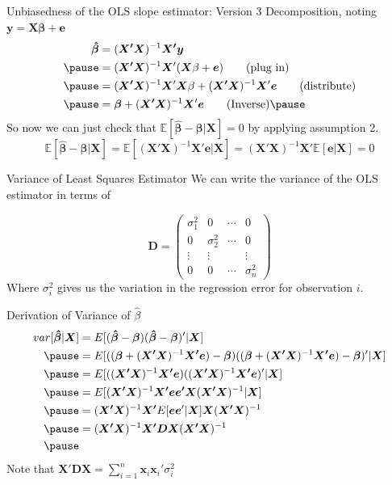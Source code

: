 \documentclass[aspectratio=169, handout]{beamer}
\numberwithin{equation}{section}
\begin{document}
\begin{frame}{Unbiasedness of the OLS slope estimator: Version 3}
Decomposition, noting $\bm{y}=\bm{X}\bm{\beta}+\bm{e}$ 
\begin{align*}
\bm{\hat{\beta}}&=(\bm{X'X})^{-1}\bm{X'y}\\ \pause
&=(\bm{X'X})^{-1}\bm{X}'(\bm{X}\beta+\bm{e}) \tag{plug in}\\ \pause
&=(\bm{X'X})^{-1}\bm{X}'\bm{X}\beta+(\bm{X'X})^{-1}\bm{X}'\bm{e}  \tag{distribute}\\ \pause
&=\bm{\beta}+(\bm{X'X})^{-1}\bm{X}'\bm{e}\tag{Inverse} \pause
\end{align*}
So now we can just check that $\mathbb{E}[\bm{\hat{\beta}}-\bm{\beta}|\bm{X}]=0$ by applying assumption 2.
$$\mathbb{E}[\bm{\hat{\beta}}-\bm{\beta}|\bm{X}]=\mathbb{E}[(\bm{X'X})^{-1}\bm{X}'\bm{e}|\bm{X}]=(\bm{X'X})^{-1}\bm{X}'\mathbb{E}[\bm{e}|\bm{X}]=0$$
\end{frame}


\begin{frame}{Variance of Least Squares Estimator}
We can write the variance of the OLS estimator in terms of 

$$\bm{D}=\begin{pmatrix} \sigma_1^2 &0 &\cdots& 0 \\ 0& \sigma_2^2& \cdots& 0 \\ \vdots & \vdots & & \vdots\\ 0&0&\cdots &\sigma_n^2\end{pmatrix}$$
Where $\sigma_i^2$ gives us the variation in the regression error for observation $i$.
\end{frame}

\begin{frame}{Derivation of Variance of $\hat{\beta}$}
\begin{align*}
var[\bm{\hat{\beta}}|\bm{X}]&=E[(\bm{\hat{\beta}}-\bm{\beta})(\bm{\hat{\beta}}-\bm{\beta})'|\bm{X}]\\ \pause
&=E[((\bm{\beta}+(\bm{X'X})^{-1}\bm{X'e})-\bm{\beta})((\bm{\beta}+(\bm{X'X})^{-1}\bm{X'e})-\bm{\beta})'|\bm{X}]\\ \pause
&=E[((\bm{X'X})^{-1}\bm{X'e})((\bm{X'X})^{-1}\bm{X'e})'|\bm{X}]\\ \pause
&=E[(\bm{X'X})^{-1}\bm{X'e}\bm{e'X}(\bm{X'X})^{-1}|\bm{X}]\\ \pause
&=(\bm{X'X})^{-1}\bm{X'}E[\bm{e}\bm{e}'|\bm{X}]\bm{X}(\bm{X'X})^{-1}\\ \pause
&=(\bm{X'X})^{-1}\bm{X'}\bm{D}\bm{X}(\bm{X'X})^{-1}\\ \pause
\end{align*}
Note that $\bm{X'}\bm{D}\bm{X}=\sum_{i=1}^n\bm{x}_i\bm{x}_i'\sigma_i^2$
\end{frame}
\end{document}
